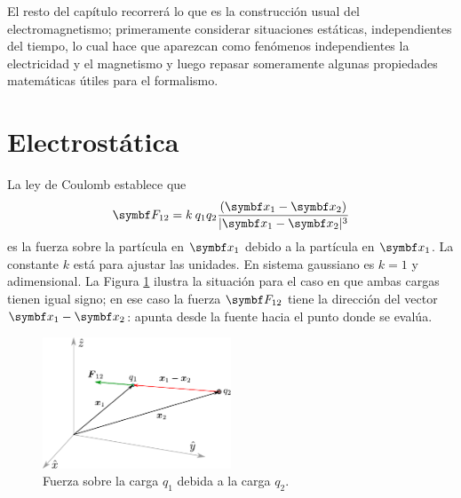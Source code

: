 \documentclass[10pt,oneside]{CBFT_book}
\begin{document}


El resto del capítulo recorrerá lo que es la construcción usual del electromagnetismo; primeramente considerar 
situaciones estáticas, independientes del tiempo, lo cual hace que aparezcan como fenómenos independientes la 
electricidad y el magnetismo y luego repasar someramente algunas propiedades matemáticas útiles para el
formalismo.

\section{Electrostática}

La ley de Coulomb establece que 
\[
	\vb{F}_{12} = k \: q_1 q_2 \frac{(\vb{x}_1 - \vb{x}_2)}{|\vb{x}_1 - \vb{x}_2 |^3}
\]
es la fuerza sobre la partícula en $\vb{x}_1$ debido a la partícula en $\vb{x}_1$. La constante $k$ está para ajustar
las unidades. En sistema gaussiano es $k=1$ y adimensional.
La Figura \ref{fig_ft1_ejescargas} ilustra la situación para el caso en que ambas cargas tienen igual signo; en ese
caso la fuerza $\vb{F}_{12}$ tiene la dirección del vector $\vb{x}_1 - \vb{x}_2$: apunta desde la fuente hacia el punto 
donde se evalúa.

\begin{figure}[!h]
	\begin{center}
	\includegraphics[width=0.5\textwidth]{images/fig_ft1_ejescargas.pdf}	 
	\end{center}
	\caption{Fuerza sobre la carga $q_1$ debida a la carga $q_2$.}
	\label{fig_ft1_ejescargas}
\end{figure} 
\end{document}
